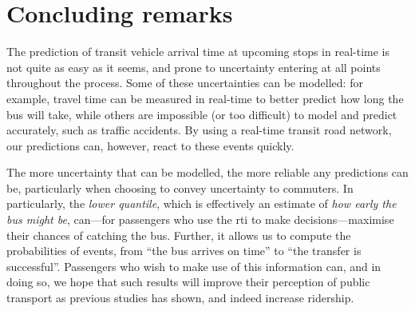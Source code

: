 \section{Concluding remarks}

The prediction of transit vehicle arrival time at upcoming stops in real-time is not quite as easy as it seems, and prone to uncertainty entering at all points throughout the process. Some of these uncertainties can be modelled: for example, travel time can be measured in real-time to better predict how long the bus will take, while others are impossible (or too difficult) to model and predict accurately, such as traffic accidents. By using a real-time transit road network, our predictions can, however, react to these events quickly.


The more uncertainty that can be modelled, the more reliable any predictions can be, particularly when choosing to convey uncertainty to commuters. In particularly, the \emph{lower quantile}, which is effectively an estimate of \emph{how early the bus might be}, can---for passengers who use the \gls{rti} to make decisions---maximise their chances of catching the bus. Further, it allows us to compute the probabilities of events, from ``the bus arrives on time'' to ``the transfer is successful''. Passengers who wish to make use of this information can, and in doing so, we hope that such results will improve their perception of public transport as previous studies has shown, and indeed increase ridership.
